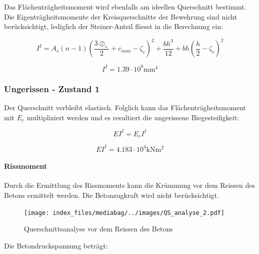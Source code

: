 \documentclass[
  letterpaper,
]{scrreprt}
\let\oldparagraph\paragraph
\renewcommand{\paragraph}[1]{\oldparagraph{#1}\mbox{}}
\begin{document}
Das Flächenträgheitsmoment wird ebenfalls am ideellen Querschnitt
bestimmt. Die Eigenträgheitsmomente der Kreisquerschnitte der Bewehrung
sind nicht berücksichtigt, lediglich der Steiner-Anteil fliesst in die
Berechnung ein:

\begin{equation}I^{I} = A_{s} \left(n - 1\right) \left(\frac{3 \oslash_{s}}{2} + c_{nom} - \zeta_{c}\right)^{2} + \frac{b h^{3}}{12} + b h \left(\frac{h}{2} - \zeta_{c}\right)^{2}\end{equation}

\begin{equation}I^{I} = 1.39 \cdot 10^{9} \text{mm}^{4}\end{equation}

\hypertarget{ungerissen---zustand-1-1}{%
\subsubsection{Ungerissen - Zustand 1}\label{ungerissen---zustand-1-1}}

Der Querschnitt verbleibt elastisch. Folglich kann das
Flächenträgheitsmoment mit \(E_c\) multipliziert werden und es
resultiert die ungerissene Biegesteifigkeit:

\begin{equation}EI^{I} = E_{c} I^{I}\end{equation}

\begin{equation}EI^{I} = 4.183 \cdot 10^{4} \text{kN} \text{m}^{2}\end{equation}

\hypertarget{rissmoment-1}{%
\paragraph{Rissmoment}\label{rissmoment-1}}

Durch die Ermittlung des Rissmoments kann die Krümmung vor dem Reissen
des Betons ermittelt werden. Die Betonzugkraft wird nicht
berücksichtigt.

\begin{figure}[H]

{\centering \texttt{[image: index\_files/mediabag/../images/QS\_analyse\_2.pdf]}

}

\caption{\label{fig-qs2}Querschnittsanalyse vor dem Reissen des Betons}

\end{figure}

Die Betondruckspannung beträgt:
\end{document}

